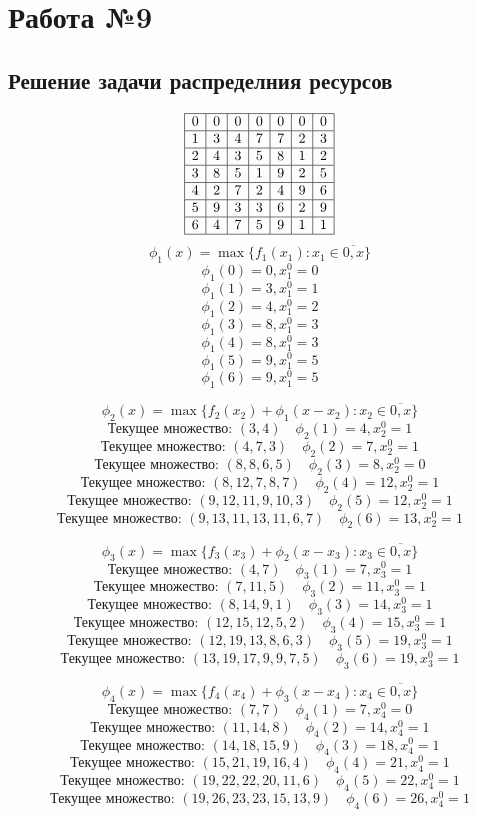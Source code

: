 \documentclass[17pt]{extarticle}
\begin{document}
\section*{Работа №9}
\subsection*{Решение задачи распределния ресурсов}
\[
    \begin{array}{|c|c|c|c|c|c|c|}
        \hline
        0 & 0 & 0 & 0 & 0 & 0 & 0 \\ \hline
        1 & 3 & 4 & 7 & 7 & 2 & 3 \\ \hline
        2 & 4 & 3 & 5 & 8 & 1 & 2 \\ \hline
        3 & 8 & 5 & 1 & 9 & 2 & 5 \\ \hline
        4 & 2 & 7 & 2 & 4 & 9 & 6 \\ \hline
        5 & 9 & 3 & 3 & 6 & 2 & 9 \\ \hline
        6 & 4 & 7 & 5 & 9 & 1 & 1 \\ \hline
    \end{array}
\]
\[\phi_1(x)=\max\{f_1(x_1) \colon x_1 \in \overline{0,x}\}\]
\[\phi_1(0)=0, x_1^0=0\]
\[\phi_1(1)=3, x_1^0=1\]
\[\phi_1(2)=4, x_1^0=2\]
\[\phi_1(3)=8, x_1^0=3\]
\[\phi_1(4)=8, x_1^0=3\]
\[\phi_1(5)=9, x_1^0=5\]
\[\phi_1(6)=9, x_1^0=5\]

\[\phi_2(x)=\max\{f_2(x_2) + \phi_1(x - x_2)\colon x_2\in \overline{0,x}\}\]
\[\text{Текущее множество: }(3, 4) \quad
    \phi_2(1)=4, x_2^0=1\]
\[\text{Текущее множество: }(4, 7, 3) \quad
    \phi_2(2)=7, x_2^0=1\]
\[\text{Текущее множество: }(8, 8, 6, 5) \quad
    \phi_2(3)=8, x_2^0=0\]
\[\text{Текущее множество: }(8, 12, 7, 8, 7) \quad
    \phi_2(4)=12, x_2^0=1\]
\[\text{Текущее множество: }(9, 12, 11, 9, 10, 3) \quad
    \phi_2(5)=12, x_2^0=1\]
\[\text{Текущее множество: }(9, 13, 11, 13, 11, 6, 7) \quad
    \phi_2(6)=13, x_2^0=1\]

\[\phi_3(x)=\max\{f_3(x_3) + \phi_2(x - x_3)\colon x_3\in \overline{0,x}\}\]
\[\text{Текущее множество: }(4, 7) \quad
    \phi_3(1)=7, x_3^0=1\]
\[\text{Текущее множество: }(7, 11, 5) \quad
    \phi_3(2)=11, x_3^0=1\]
\[\text{Текущее множество: }(8, 14, 9, 1) \quad
    \phi_3(3)=14, x_3^0=1\]
\[\text{Текущее множество: }(12, 15, 12, 5, 2) \quad
    \phi_3(4)=15, x_3^0=1\]
\[\text{Текущее множество: }(12, 19, 13, 8, 6, 3) \quad
    \phi_3(5)=19, x_3^0=1\]
\[\text{Текущее множество: }(13, 19, 17, 9, 9, 7, 5) \quad
    \phi_3(6)=19, x_3^0=1\]

\[\phi_4(x)=\max\{f_4(x_4) + \phi_3(x - x_4)\colon x_4\in \overline{0,x}\}\]
\[\text{Текущее множество: }(7, 7) \quad
    \phi_4(1)=7, x_4^0=0\]
\[\text{Текущее множество: }(11, 14, 8) \quad
    \phi_4(2)=14, x_4^0=1\]
\[\text{Текущее множество: }(14, 18, 15, 9) \quad
    \phi_4(3)=18, x_4^0=1\]
\[\text{Текущее множество: }(15, 21, 19, 16, 4) \quad
    \phi_4(4)=21, x_4^0=1\]
\[\text{Текущее множество: }(19, 22, 22, 20, 11, 6) \quad
    \phi_4(5)=22, x_4^0=1\]
\[\text{Текущее множество: }(19, 26, 23, 23, 15, 13, 9) \quad
    \phi_4(6)=26, x_4^0=1\]
\end{document}
